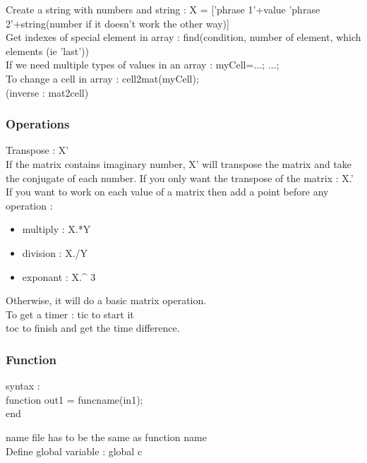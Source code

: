 \documentclass[../main.tex]{subfiles}
\begin{document}
Create a string with numbers and string : X = ['phrase 1'+value 'phrase 2'+string(number if it doesn't work the other way)]\\

Get indexes of special element in array : find(condition, number of element, which elements (ie 'last'))\\

If we need multiple types of values in an array : myCell={$\dots$; $\dots$};\\
To change a cell in array : cell2mat(myCell);\\
(inverse : mat2cell)\\




\subsubsection{Operations}
Transpose : X'\\
If the matrix contains imaginary number, X' will transpose the matrix and take the conjugate of each number. If you only want the transpose of the matrix : X.'\\
If you want to work on each value of a matrix then add a point before any operation :\\
\begin{itemize}
    \item multiply : X.*Y\\
    \item division : X./Y\\
    \item exponant : X.\^{} 3\\
\end{itemize}
Otherwise, it will do a basic matrix operation.\\

To get a timer : tic to start it\\
toc to finish and get the time difference.\\

\subsubsection{Function}
syntax : \\
function out1 = funcname(in1);\\
end

\warning name file has to be the same as function name\\

Define global variable : global c\\
\end{document}
